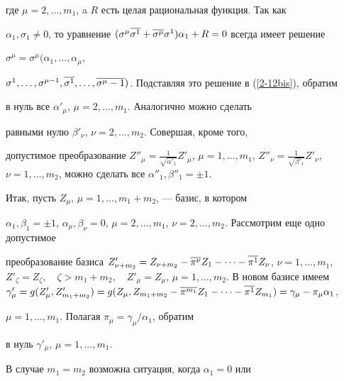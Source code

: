 где $\mu =2,\dotsc,m_1$, a $R$ есть целая рациональная функция. Так как


$\alpha_1,\sigma_1\neq 0$, то уравнение $(\sigma^\mu \ol{\sigma^1}


+\ol{\sigma^\mu}\sigma^1)\alpha_1 +R=0$ всегда имеет решение


$\sigma^\mu=\sigma^\mu(\alpha_1, \dotsc, \alpha_\mu,$


$\sigma^1,\dotsc,\sigma^{\mu-1},\ol{\sigma^1}, \dotsc,


\ol{\sigma^\mu-1})$. Подставляя это решение в (\ref{2-12bis}), обратим


в нуль все $\alpha'_\mu$, $\mu=2,\dotsc,m_1$. Аналогично можно сделать


равными нулю $\beta'_\nu$, $\nu=2,\dotsc,m_2$. Совершая, кроме того,


допустимое преобразование $Z''_\mu = \frac{1}{\sqrt{\alpha'_1}}


Z'_\mu$, $\mu = 1,\dotsc,m_1$, $Z''_\nu = \frac{1}{\sqrt{\beta'_1}}


Z'_\nu$, $\nu = 1,\dotsc,m_2$, можно сделать все $\alpha''_1,\beta''_1


=\pm 1$.





Итак, пусть $Z_\mu$, $\mu=1,\dotsc,m_1+m_2$, --- базис, в котором


$\alpha_1,\beta_1=\pm 1$, $\alpha_\mu,\beta_\nu=0$, $\mu=2,\dotsc,


m_1$, $\nu=2,\dotsc,m_2$. Рассмотрим еще одно допустимое


преобразование базиса $Z'_{\nu + m_2} = Z_{\nu + m_2} - \ol{\pi^\nu}


Z_1 - \dotsb - \ol{\pi^1} Z_\nu $, $\nu = 1,\dotsc,m_1$, $Z'_\zeta =


Z_\zeta, \quad \zeta > m_1+m_2, \quad Z'_\mu = Z_\mu$, $\mu =


1,\dotsc,m_2$. В новом базисе имеем $\gamma'_\mu =


g(Z'_\mu,Z'_{m_1+m_2}) = g(Z_\mu,Z_{m_1+m_2} - \ol{\pi^{m_1}} Z_1


-\dotsb- \ol{\pi^1} Z_{m_1}) = \gamma_\mu - \pi_\mu \alpha_1$,


$\mu=1,\dotsc,m_1$. Полагая $\pi_\mu = \gamma_\mu / \alpha_1$, обратим


в нуль $\gamma'_\mu$, $\mu=1,\dotsc,m_1$.





В случае $m_1=m_2$ возможна ситуация, когда $\alpha_1=0$ или


